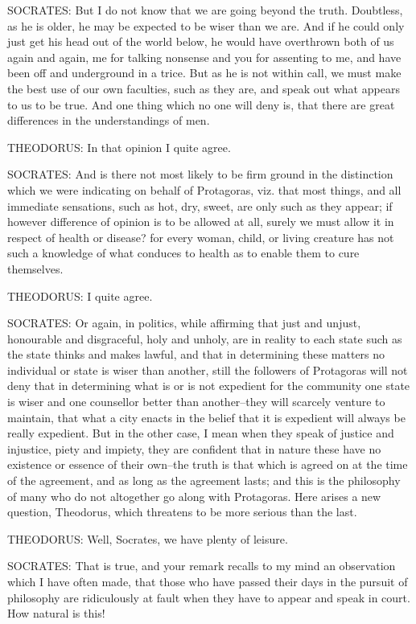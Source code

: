 SOCRATES: But I do not know that we are going beyond the truth.
Doubtless, as he is older, he may be expected to be wiser than we are.
And if he could only just get his head out of the world below, he would
have overthrown both of us again and again, me for talking nonsense and
you for assenting to me, and have been off and underground in a trice.
But as he is not within call, we must make the best use of our own
faculties, such as they are, and speak out what appears to us to be
true. And one thing which no one will deny is, that there are great
differences in the understandings of men.

THEODORUS: In that opinion I quite agree.

SOCRATES: And is there not most likely to be firm ground in the
distinction which we were indicating on behalf of Protagoras, viz. that
most things, and all immediate sensations, such as hot, dry, sweet,
are only such as they appear; if however difference of opinion is to be
allowed at all, surely we must allow it in respect of health or disease?
for every woman, child, or living creature has not such a knowledge of
what conduces to health as to enable them to cure themselves.

THEODORUS: I quite agree.

SOCRATES: Or again, in politics, while affirming that just and unjust,
honourable and disgraceful, holy and unholy, are in reality to each
state such as the state thinks and makes lawful, and that in determining
these matters no individual or state is wiser than another, still the
followers of Protagoras will not deny that in determining what is or is
not expedient for the community one state is wiser and one counsellor
better than another--they will scarcely venture to maintain, that what
a city enacts in the belief that it is expedient will always be really
expedient. But in the other case, I mean when they speak of justice and
injustice, piety and impiety, they are confident that in nature these
have no existence or essence of their own--the truth is that which is
agreed on at the time of the agreement, and as long as the agreement
lasts; and this is the philosophy of many who do not altogether go along
with Protagoras. Here arises a new question, Theodorus, which threatens
to be more serious than the last.

THEODORUS: Well, Socrates, we have plenty of leisure.

SOCRATES: That is true, and your remark recalls to my mind an
observation which I have often made, that those who have passed their
days in the pursuit of philosophy are ridiculously at fault when they
have to appear and speak in court. How natural is this!

